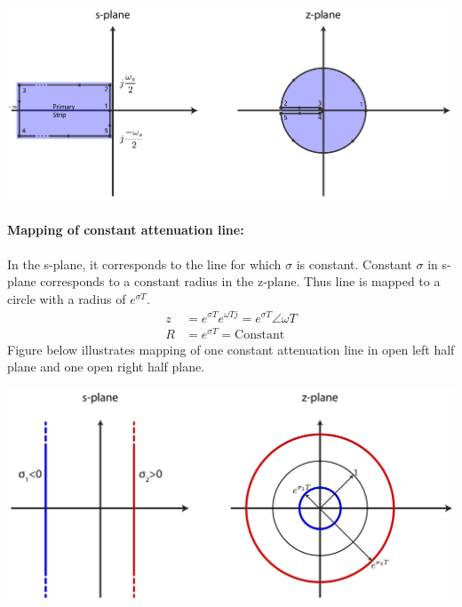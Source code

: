 \documentclass[twoside]{article}
\begin{document}
    \begin{center}
\begin{minipage}[h]{0.95\linewidth}
    \begin{center}
      \includegraphics[width=\textwidth]{primary}
    \end{center}
\end{minipage}
    \end{center}
%
\paragraph{Mapping of constant attenuation line:} In the s-plane, it corresponds
to the line for which $\sigma$ is constant. Constant $\sigma$ in s-plane
corresponds to a constant radius in the z-plane. Thus line is mapped to
a circle with a radius of $e^{\sigma T}$.
%
\begin{align*}
z &= e^{\sigma T} e^{\omega T j} =  e^{\sigma T} \angle \omega T\\
R &= e^{\sigma T} = \mathrm{Constant}
\end{align*}
%
Figure below illustrates mapping of one constant  attenuation line in
open left half plane and one open right half plane.
%
    \begin{center}
\begin{minipage}[h]{0.95\linewidth}
    \begin{center}
      \includegraphics[width=\textwidth]{sigma}
    \end{center}
\end{minipage}
    \end{center}
\end{document}
